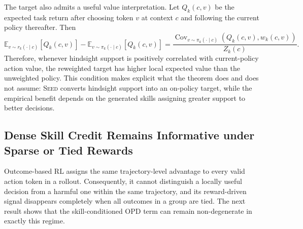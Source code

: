 The target also admits a useful value interpretation. Let
$Q_k(c,v)$
be the expected task return after choosing token $v$ at context $c$ and following the current policy thereafter. Then
\begin{equation}
 \mathbb E_{v\sim r_k(\cdot\mid c)}[Q_k(c,v)]
 -
 \mathbb E_{v\sim\pi_k(\cdot\mid c)}[Q_k(c,v)]
 =
 \frac{\operatorname{Cov}_{v\sim\pi_k(\cdot\mid c)}\!\left(Q_k(c,v),w_k(c,v)\right)}{Z_k(c)}.
 \label{eq:value_alignment_identity}
\end{equation}
Therefore, whenever hindsight support is positively correlated with current-policy action value, the reweighted target has higher local expected value than the unweighted policy. This condition makes explicit what the theorem does and does not assume: \textsc{Seed} converts hindsight support into an on-policy target, while the empirical benefit depends on the generated skills assigning greater support to better decisions.

\subsection{Dense Skill Credit Remains Informative under Sparse or Tied Rewards}
\label{app:theory_dense}
Outcome-based RL assigns the same trajectory-level advantage to every valid action token in a rollout. Consequently, it cannot distinguish a locally useful decision from a harmful one within the same trajectory, and its reward-driven signal disappears completely when all outcomes in a group are tied. The next result shows that the skill-conditioned OPD term can remain non-degenerate in exactly this regime.


